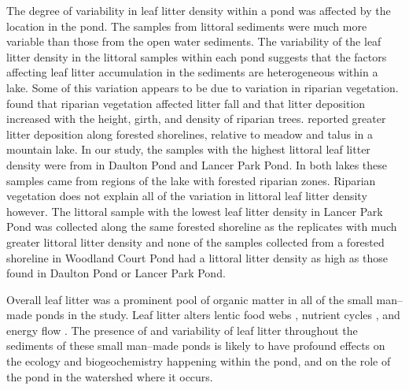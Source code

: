 \documentclass{article}
\providecommand\citet{\cite}
\begin{document}
The degree of variability in leaf litter density within a pond was affected by the location in the pond. The samples from littoral sediments were much more variable than those from the open water sediments.  The variability of the leaf litter density in the littoral samples within each pond suggests that the factors affecting leaf litter accumulation in the sediments are heterogeneous within a lake. Some of this variation appears to be due to variation in riparian vegetation. \citet{France_1995} found that riparian vegetation affected litter fall and that litter deposition increased with the height, girth, and density of riparian trees. \citet{Rau_1976} reported greater litter deposition along forested shorelines, relative to meadow and talus in a mountain lake. In our study, the samples with the highest littoral leaf litter density were from in Daulton Pond and Lancer Park Pond. In both lakes these samples came from regions of the lake with forested riparian zones. Riparian vegetation does not explain all of the variation in littoral leaf litter density however. The littoral sample with the lowest leaf litter density in Lancer Park Pond was collected along the same forested shoreline as the replicates with much greater littoral litter density and none of the samples collected from a forested shoreline in Woodland Court Pond had a littoral litter density as high as those found in Daulton Pond or Lancer Park Pond. 

Overall leaf litter was a prominent pool of organic matter in all of the small man--made ponds in the study. Leaf litter alters lentic food webs \cite{Kobayashi_2011,Cottingham_2013,Fey_2015a}, nutrient cycles \cite{McConnell_1968,France_1995}, and energy flow \cite{Hodkinson_1975}. The presence of and variability of leaf litter throughout the sediments of these small man--made ponds is likely to have profound effects on the ecology and biogeochemistry happening within the pond, and on the role of the pond in the watershed where it occurs.
\end{document}
